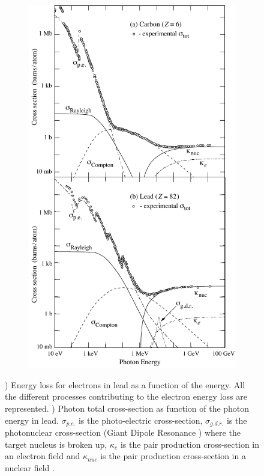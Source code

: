 \begin{figure}[htbp!]
\begin{subfigure}[t]{0.43\textwidth}
    \includegraphics[width=1\linewidth]{chap2/fig/sigma_both_06.pdf}
    \caption{} \label{fig:GammaEMloss}
  \end{subfigure}
  \caption{) Energy loss for electrons in lead as a function of the energy. All the different processes contributing to the electron energy loss are represented. ) Photon total cross-section as function of the photon energy in lead. $\sigma_{p.e.}$ is the photo-electric cross-section, $\sigma_{g.d.r.}$ is the photonuclear cross-section (Giant Dipole Resonance \cite{Berman:1975tt}) where the target nucleus is broken up, $\kappa_{e}$ is the pair production cross-section in an electron field and $\kappa_{nuc}$ is the pair production cross-section in a nuclear field \cite{Patrignani:2016xqp}.}
\end{figure}

